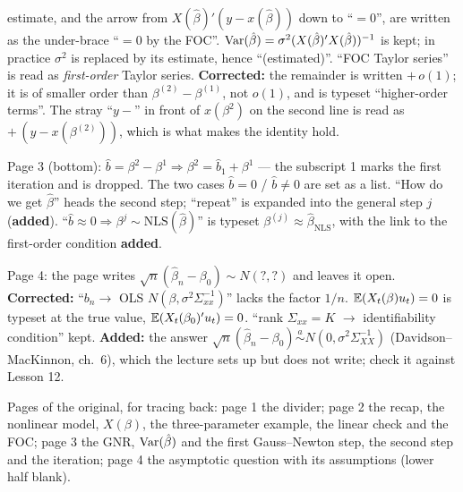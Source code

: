 \documentclass[11pt]{article}
\begin{document}
\begin{transcriptnotes}
        estimate, and the arrow from $X(\hat\beta)'(y - x(\hat\beta))$ down to ``$=0$'',
        are written as the under-brace ``$=0$ by the FOC''. $\operatorname{Var}(\hat\beta) =
        \sigma^{2}(X(\hat\beta)'X(\hat\beta))^{-1}$ is kept; in practice $\sigma^{2}$ is
        replaced by its estimate, hence ``(estimated)''. ``FOC Taylor series'' is read
        as \emph{first-order} Taylor series. \textbf{Corrected:} the remainder is
        written $+\,o(1)$; it is of smaller order than $\beta^{(2)} - \beta^{(1)}$, not
        $o(1)$, and is typeset ``higher-order terms''. The stray ``$y -$'' in front of
        $x(\beta^{2})$ on the second line is read as $+\,(y - x(\beta^{(2)}))$, which is
        what makes the identity hold.
  \item Page 3 (bottom): $\hat b = \beta^{2} - \beta^{1} \Rightarrow \beta^{2} = \hat b_{1} +
        \beta^{1}$ --- the subscript 1 marks the first iteration and is dropped. The two
        cases $\hat b = 0$ / $\hat b \neq 0$ are set as a list. ``How do we get
        $\hat\beta$'' heads the second step; ``repeat'' is expanded into the general
        step $j$ (\textbf{added}). ``$\hat b \approx 0 \Rightarrow \beta^{j} \sim
        \mathrm{NLS}(\hat\beta)$'' is typeset $\beta^{(j)} \approx \hat\beta_{\text{NLS}}$,
        with the link to the first-order condition \textbf{added}.
  \item Page 4: the page writes $\sqrt{n}(\hat\beta_{n} -
        \beta_{0}) \sim N(?,?)$ and leaves it open. \textbf{Corrected:} ``$b_{n} \to$
        OLS $N(\beta, \sigma^{2}\Sigma_{xx}^{-1})$'' lacks the factor $1/n$.
        $\mathbb{E}(X_{t}(\beta)u_{t}) = 0$ is typeset at the true value, $\mathbb{E}(X_{t}(\beta_{0})'u_{t})
        = 0$. ``rank $\Sigma_{xx} = K$ $\to$ identifiability condition'' kept.
        \textbf{Added:} the answer $\sqrt{n}(\hat\beta_{n} - \beta_{0}) \overset{a}{\sim}
        N(0, \sigma^{2}\Sigma_{XX}^{-1})$ (Davidson--MacKinnon, ch.~6), which the lecture
        sets up but does not write; check it against Lesson 12.
  \item Pages of the original, for tracing back: page 1 the divider; page 2 the
        recap, the nonlinear model, $X(\beta)$, the three-parameter example, the
        linear check and the FOC; page 3 the GNR, $\operatorname{Var}(\hat\beta)$ and the first
        Gauss--Newton step, the second step and the iteration; page 4 the asymptotic
        question with its assumptions (lower half blank).
\end{transcriptnotes}
\end{document}

